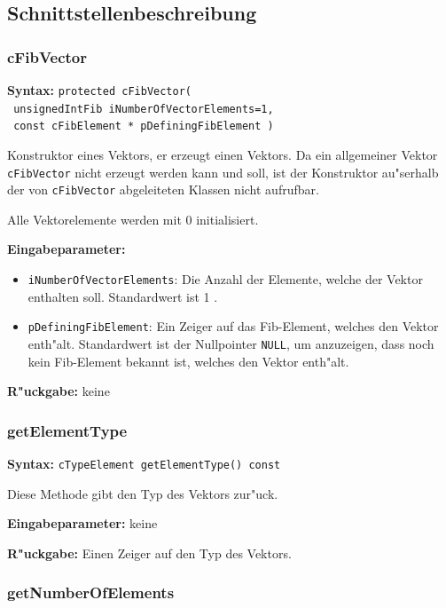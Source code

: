 \subsection{Schnittstellenbeschreibung}

\subsubsection{cFibVector}

\textbf{Syntax:} \verb|protected cFibVector(| \\\verb| unsignedIntFib iNumberOfVectorElements=1,| \\\verb| const cFibElement * pDefiningFibElement )|

\bigskip\noindent
Konstruktor eines Vektors, er erzeugt einen Vektors. Da ein allgemeiner Vektor \verb|cFibVector| nicht erzeugt werden kann und soll, ist der Konstruktor au"serhalb der von \verb|cFibVector| abgeleiteten Klassen nicht aufrufbar.

Alle Vektorelemente werden mit 0 initialisiert.

\bigskip\noindent
\textbf{Eingabeparameter:}
\begin{itemize}
 \item \verb|iNumberOfVectorElements|: Die Anzahl der Elemente, welche der Vektor enthalten soll. Standardwert ist 1 .
 \item \verb|pDefiningFibElement|: Ein Zeiger auf das Fib-Element, welches den Vektor enth"alt. Standardwert ist der Nullpointer \verb|NULL|, um anzuzeigen, dass noch kein Fib-Element bekannt ist, welches den Vektor enth"alt.
\end{itemize}

\bigskip\noindent
\textbf{R"uckgabe:} keine


\subsubsection{getElementType}

\textbf{Syntax:} \verb|cTypeElement getElementType() const|

\bigskip\noindent
Diese Methode gibt den Typ des Vektors zur"uck.

\bigskip\noindent
\textbf{Eingabeparameter:} keine

\bigskip\noindent
\textbf{R"uckgabe:} Einen Zeiger auf den Typ des Vektors.


\subsubsection{getNumberOfElements}

